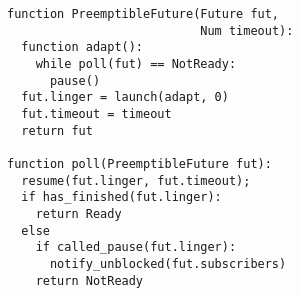 \begin{figure}
\begin{lstlisting}[label=lst:future,caption=Futures adapter type (pseudocode)]
function PreemptibleFuture(Future fut,
                           Num timeout):
  function adapt():
    while poll(fut) == NotReady:
      pause()
  fut.linger = launch(adapt, 0)
  fut.timeout = timeout
  return fut

function poll(PreemptibleFuture fut):
  resume(fut.linger, fut.timeout);
  if has_finished(fut.linger):
    return Ready
  else
    if called_pause(fut.linger):
      notify_unblocked(fut.subscribers)
    return NotReady
\end{lstlisting}
\end{figure}
